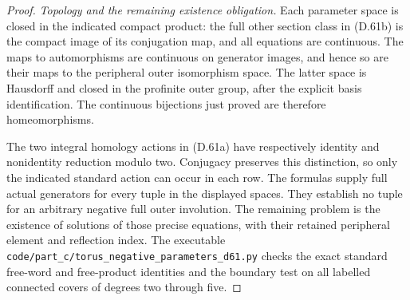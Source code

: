 \begin{proof}
\emph{Topology and the remaining existence obligation.}
Each parameter space is closed in the indicated
compact product: the full other section class
in (D.61b) is the compact image of its conjugation
map, and all equations are continuous.
The maps to automorphisms are continuous on
generator images, and hence so are their maps
to the peripheral outer isomorphism space.
The latter space is Hausdorff and closed in
the profinite outer group, after the explicit
basis identification. The continuous
bijections just proved are therefore
homeomorphisms.

The two integral homology actions in (D.61a)
have respectively identity and nonidentity
reduction modulo two. Conjugacy preserves
this distinction, so only the indicated
standard action can occur in each row.
The formulas supply full actual generators
for every tuple in the displayed spaces.
They establish no tuple for an arbitrary
negative full outer involution.
The remaining problem is the existence of
solutions of those precise equations,
with their retained peripheral element and
reflection index.
The executable
\texttt{code/part\_c/torus\_negative\_parameters\_d61.py}
checks the exact standard free-word and
free-product identities and the boundary
test on all labelled connected covers of
degrees two through five.
\end{proof}
